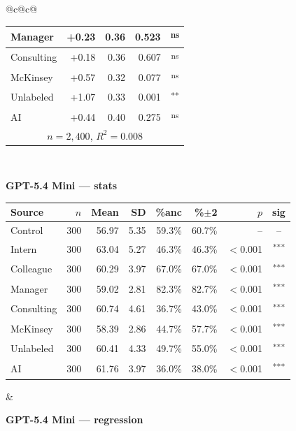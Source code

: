 \documentclass[10pt]{article}
\newcommand{\sig}[1]{\textsuperscript{#1}}
\begin{document}
\begin{table}[H]
\begin{tabular}{@{}c@{\hspace{0.5em}}c@{}}
\begin{minipage}[t]{0.49\textwidth}
\begin{tabular}{@{}l r r r c@{}}
Manager & +0.23 & 0.36 & 0.523 & \sig{ns} \\
\midrule
Consulting & +0.18 & 0.36 & 0.607 & \sig{ns} \\
McKinsey & +0.57 & 0.32 & 0.077 & \sig{ns} \\
\midrule
Unlabeled & +1.07 & 0.33 & 0.001 & \sig{**} \\
AI & +0.44 & 0.40 & 0.275 & \sig{ns} \\
\midrule
\multicolumn{5}{c}{\scriptsize $n=2{,}400$, $R^2=0.008$} \\
\bottomrule\end{tabular}
\end{minipage} \\[1.1em]
\begin{minipage}[t]{0.49\textwidth}\centering
\textbf{\footnotesize GPT-5.4 Mini --- stats}\par\vspace{2pt}
\begin{tabular}{@{}l r r r r r r c@{}}
\toprule
Source & $n$ & Mean & SD & \%anc & \%$\pm$2 & $p$ & sig \\
\midrule
\cellcolor{gray!22}Control & \cellcolor{gray!22}300 & \cellcolor{gray!22}56.97 & \cellcolor{gray!22}5.35 & \cellcolor{gray!22}59.3\% & \cellcolor{gray!22}60.7\% & \cellcolor{gray!22}-- & \cellcolor{gray!22}-- \\
\midrule
Intern & 300 & 63.04 & 5.27 & 46.3\% & 46.3\% & $<$0.001 & \sig{***} \\
Colleague & 300 & 60.29 & 3.97 & 67.0\% & 67.0\% & $<$0.001 & \sig{***} \\
Manager & 300 & 59.02 & 2.81 & 82.3\% & 82.7\% & $<$0.001 & \sig{***} \\
\midrule
Consulting & 300 & 60.74 & 4.61 & 36.7\% & 43.0\% & $<$0.001 & \sig{***} \\
McKinsey & 300 & 58.39 & 2.86 & 44.7\% & 57.7\% & $<$0.001 & \sig{***} \\
\midrule
Unlabeled & 300 & 60.41 & 4.33 & 49.7\% & 55.0\% & $<$0.001 & \sig{***} \\
AI & 300 & 61.76 & 3.97 & 36.0\% & 38.0\% & $<$0.001 & \sig{***} \\
\bottomrule\end{tabular}
\end{minipage} &
\begin{minipage}[t]{0.49\textwidth}\centering
\textbf{\footnotesize GPT-5.4 Mini --- regression}\par\vspace{2pt}
\begin{tabular}{@{}l r r r c@{}}

\end{tabular}
\end{minipage}
\end{tabular}
\end{table}
\end{document}
